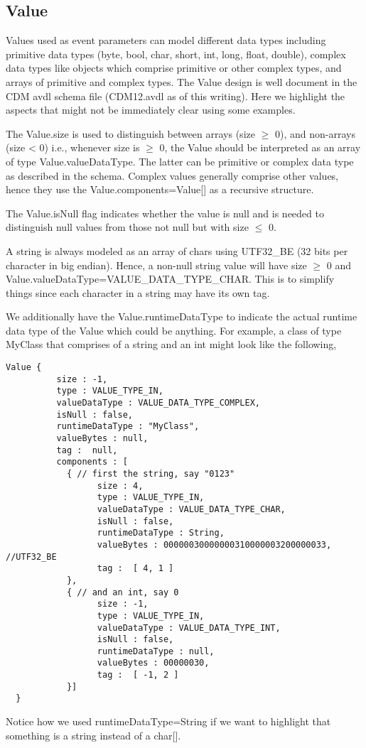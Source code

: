 \subsection{Value}\label{sec:values}
{\sf Value}s used as event parameters can model different data types including primitive data types (byte, bool, char, short, int, long, float, double), complex data types like objects which comprise primitive or other complex types, and arrays of primitive and complex types. The Value design is well document in the CDM avdl schema file (CDM12.avdl as of this writing). Here we highlight the aspects that might not be immediately clear using some examples.

The Value.size is used to distinguish between arrays (size $\ge$ 0), and non-arrays (size < 0) i.e., whenever size is $\ge$ 0, the Value should be interpreted as an array of type Value.valueDataType. The latter can be primitive or complex data type as described in the schema. Complex values generally comprise other values, hence they use the Value.components=Value[] as a recursive structure.

The Value.isNull flag indicates whether the value is null and is needed to distinguish null values from those not null but with size $\le$ 0.

A string is always modeled as an array of chars using UTF32\_BE (32 bits per character in big endian). Hence, a non-null string value will have size $\ge$ 0 and Value.valueDataType=VALUE\_DATA\_TYPE\_CHAR. This is to simplify things since each character in a string may have its own tag.

We additionally have the Value.runtimeDataType to indicate the actual runtime data type of the Value which could be anything. For example, a class of type MyClass that comprises of a string and an int might look like the following,
\begin{Verbatim}[fontsize=\small]
   Value {
          size : -1,
          type : VALUE_TYPE_IN,
          valueDataType : VALUE_DATA_TYPE_COMPLEX,
          isNull : false,
          runtimeDataType : "MyClass",
          valueBytes : null,
          tag :  null,
          components : [ 
            { // first the string, say "0123"
                  size : 4,
                  type : VALUE_TYPE_IN,
                  valueDataType : VALUE_DATA_TYPE_CHAR,
                  isNull : false,
                  runtimeDataType : String,
                  valueBytes : 00000030000000310000003200000033, //UTF32_BE
                  tag :  [ 4, 1 ]
            },
            { // and an int, say 0
                  size : -1,
                  type : VALUE_TYPE_IN,
                  valueDataType : VALUE_DATA_TYPE_INT,
                  isNull : false,
                  runtimeDataType : null,
                  valueBytes : 00000030,
                  tag :  [ -1, 2 ]
            }]
  }
\end{Verbatim} 
Notice how we used runtimeDataType=String if we want to highlight that something is a string instead of a char[].

